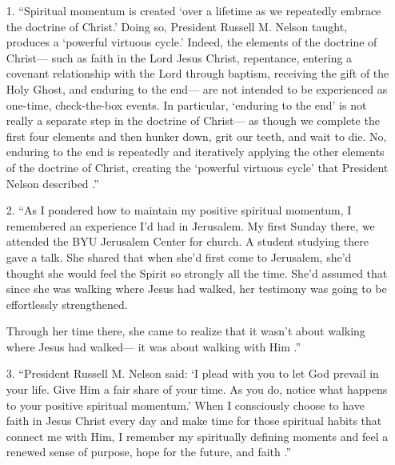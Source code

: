 \documentclass{article}
\begin{document}
                    \begin{enumerate}
                        \item [1.] ``Spiritual momentum is created `over a lifetime as we repeatedly embrace the doctrine of Christ.' 
                        Doing so, President Russell M. Nelson taught, produces a `powerful virtuous cycle.' 
                        Indeed, the elements of the doctrine of Christ— such as faith in the Lord Jesus Christ, repentance, entering a covenant relationship with the Lord through baptism, receiving the gift of the Holy Ghost, and enduring to the end— are not intended to be experienced as one-time, check-the-box events. 
                        In particular, `enduring to the end' is not really a separate step in the doctrine of Christ— as though we complete the first four elements and then hunker down, grit our teeth, and wait to die. 
                        No, enduring to the end is repeatedly and iteratively applying the other elements of the doctrine of Christ, creating the `powerful virtuous cycle' that President Nelson described \cite{Renlund}.''

                        \item[2.] ``As I pondered how to maintain my positive spiritual momentum, I remembered an experience I’d had in Jerusalem. 
                        My first Sunday there, we attended the BYU Jerusalem Center for church. A student studying there gave a talk. 
                        She shared that when she’d first come to Jerusalem, she’d thought she would feel the Spirit so strongly all the time. She’d assumed that since she was walking where Jesus had walked, her testimony was going to be effortlessly strengthened.

                        Through her time there, she came to realize that it wasn’t about walking where Jesus had walked— it was about walking with Him \cite{Wood}.''

                        \item[3.] ``President Russell M. Nelson said: `I plead with you to let God prevail in your life. Give Him a fair share of your time. 
                        As you do, notice what happens to your positive spiritual momentum.' 
                        When I consciously choose to have faith in Jesus Christ every day and make time for those spiritual habits that connect me with Him, I remember my spiritually defining moments and feel a renewed sense of purpose, hope for the future, and faith \cite{Anonymous}.''
                    \end{enumerate}
                    
\end{document}
